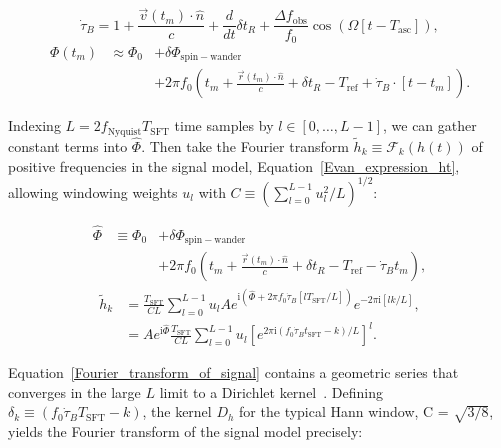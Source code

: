 \begin{equation}
\dot{\tau}_B = 1 + \frac{\vec{v}(t_m) \cdot \hat{n}}{c} + \frac{d}{dt}\delta t_R+ \frac{\Delta f_\mathrm{obs}}{f_0} \cos \left(\Omega [t - T_\mathrm{asc}]\right),
\label{tau-time-derivative}
\end{equation}
\begin{eqnarray}
\Phi(t_m) &\approx \Phi_0 &+ \delta \Phi_\mathrm{spin-wander} \nonumber \\
  & &+ 2 \pi f_0 \left(t_m + \frac{\vec{r}(t_m)\cdot \hat{n}}{c} +\delta t_R- T_\mathrm{ref} + \dot{\tau}_B \cdot [t-t_m] \right). 
\end{eqnarray}

\noindent Indexing $L = 2f_\mathrm{Nyquist}T_\mathrm{SFT}$ time samples by $l\in [0,\ldots,L-1]$, we can gather constant terms into $\hat{\Phi}$.
Then take the Fourier transform $\tilde{h}_k \equiv \mathcal{F}_k(h(t))$ of positive frequencies in the signal model, Equation~\ref{Evan_expression_ht}, allowing windowing weights $u_l$ with $C\equiv\left(\sum_{l=0}^{L-1} u_l^2 / L \right)^{1/2}$:

\begin{eqnarray} 
\hat{\Phi} &\equiv \Phi_0 &+ \delta\Phi_\mathrm{spin-wander} \nonumber\\
  & &+ 2\pi f_0 \left(t_m + \frac{\vec{r}(t_m)\cdot\hat{n}}{c} +\delta t_R- T_\mathrm{ref} - \dot{\tau}_B t_m\right),
\end{eqnarray}
\begin{eqnarray}
\tilde{h}_k 
  &= \frac{T_\mathrm{SFT}}{CL} \sum\limits^{L-1}_{l=0} u_l A e^{\mathrm{i} \left(\hat{\Phi} + 2\pi f_0 \dot{\tau}_B [l T_\mathrm{SFT}/L]\right)} e^{- 2\pi \mathrm{i} [lk /L]},\\ 
  &= A e^{\mathrm{i} \hat{\Phi}} \frac{T_\mathrm{SFT}}{CL} \sum\limits^{L-1}_{l=0} u_l \left[e^{2\pi \mathrm{i} \left(f_0 \dot{\tau}_B t_\mathrm{SFT} - k\right)/L} \right]^l.
\label{Fourier_transform_of_signal}
\end{eqnarray}

\noindent Equation~\ref{Fourier_transform_of_signal} contains a geometric series that converges in the large $L$ limit to a Dirichlet kernel~\cite{TwoSpectCoherentGoetz2015}.
Defining $\delta_k \equiv \left(f_0 \dot{\tau}_B T_\mathrm{SFT} - k\right)$, the kernel $D_h$ for the typical Hann window, C = $\sqrt{3/8}$, yields the Fourier transform of the signal model precisely:

